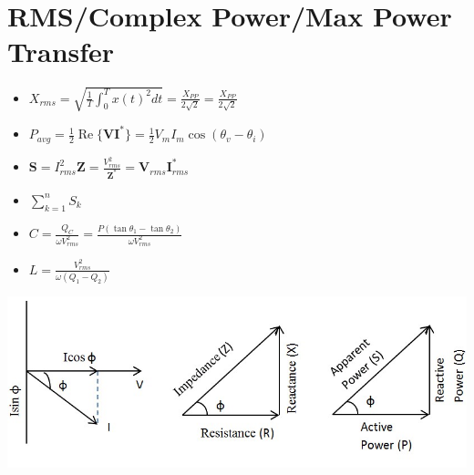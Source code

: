 \documentclass[10pt,letterpaper,final,twoside,notitlepage]{article}
\renewcommand{\Re}{\operatorname{Re}} %
\begin{document}
\section*{RMS/Complex Power/Max Power Transfer} \label{sec:Complex Power}
	\vspace{-6mm}
	\begin{multicols}{2}
		\begin{itemize}[noitemsep]
			\item $X_{rms}=\sqrt{\frac{1}{T} \int_{0}^{T} x(t)^2 dt}=\frac{X_{PP}}{2 \sqrt{2}}=\frac{X_{PP}}{2 \sqrt{2}}$
			\item $P_{avg}=\frac{1}{2} \Re\lbrace \mathbf{V} \mathbf{I}^* \rbrace=\frac{1}{2}V_{m}I_{m}\cos \left(\theta_v -\theta_i \right)$
			\item $\mathbf{S} = I_{rms}^2\mathbf{Z} = \frac{V_{rms}^2}{\mathbf{Z}^*} = \mathbf{V}_{rms}\mathbf{I}_{rms}^*$ \vspace{1.2mm}
			\item $\sum_{k=1}^{n} S_{k}$ \vspace{1.2mm}
			\item $C = \frac{Q_{C}}{\omega V_{rms}^2} = \frac{P\left( \tan \theta_1 - \tan \theta_2 \right)}{\omega V_{rms}^2}$ \vspace{1.2mm}
			\item $L=\frac{V_{rms}^2}{\omega \left(Q_1 - Q_2 \right)}$
		\end{itemize}

		\columnbreak
		
		\includegraphics[scale=0.375]{Phasor_Power_Triangle.jpg} %
		\label{fig:Phasor/Power Triangle}
	\end{multicols}
	\vspace{-4mm}
\end{document}

